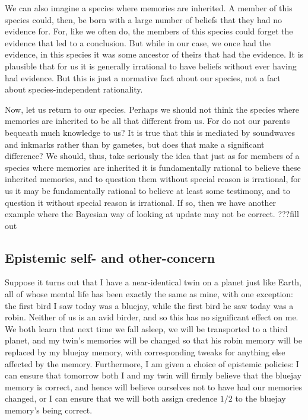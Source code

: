 We can also imagine a species where memories are inherited. A member of this species could, then, be born with a 
large number of beliefs that they had no evidence for. For, like we often do, the members of this species could forget the
evidence that led to a conclusion. But while in our case, we once had the evidence, in this species it was some ancestor
of theirs that had the evidence. It is plausible that for us it is generally irrational to have beliefs without ever having had
evidence. But this is just a normative fact about our species, not a fact about species-independent rationality.

Now, let us return to our species. Perhaps we should not think the species where memories are inherited to be all that
different from us. For do not our parents bequeath much knowledge to us? It is true that this is mediated by soundwaves and
inkmarks rather than by gametes, but does that make a significant difference? We should, thus, take seriously the idea
that just as for members of a species where memories are inherited it is fundamentally rational to believe these inherited
memories, and to question them without special reason is irrational, for us it may be fundamentally rational to believe
at least some testimony, and to question it without special reason is irrational. If so, then we have another example
where the Bayesian way of looking at update may not be correct.
???fill out

\subsection{Epistemic self- and other-concern}
Suppose it turns out that I have a near-identical twin on a planet just like Earth, all of whose mental life has been exactly 
the same as mine, with one exception: the first bird I saw today was a bluejay, while the first bird he saw today was a robin. 
Neither of us is an avid birder, and so this has no significant effect on me. We both learn that next time we fall asleep, we 
will be transported to a third planet, and my twin's memories will be changed so that his robin memory will be replaced by my
bluejay memory, with corresponding tweaks for anything else affected by the memory. Furthermore, I am given a choice of epistemic
policies: I can ensure that tomorrow both I and my twin will firmly believe that the bluejay memory is correct, and hence will 
believe ourselves not to have had our memories changed, or I can ensure that we will both assign credence $1/2$ to the bluejay 
memory's being correct. 

